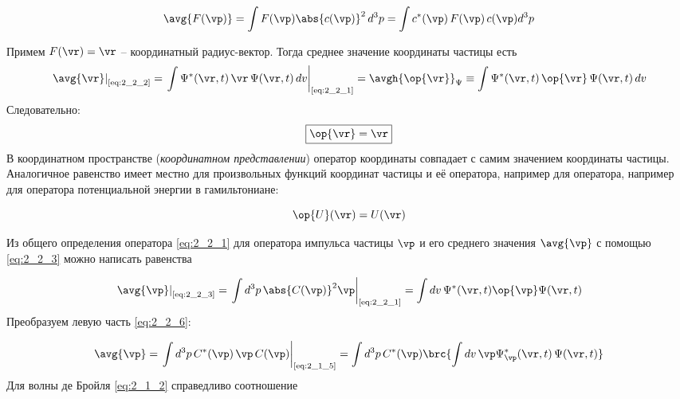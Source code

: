 \begin{equation}
\label{eq:2_2_3}
\avg{F(\vp)} = \int F(\vp) \abs{c(\vp)}^2 \, d^3 p = \int c^*(\vp) \, F(\vp) \, c(\vp) d^3 p 
\end{equation}

Примем $F(\vr) = \vr$ -- координатный радиус-вектор. Тогда среднее значение координаты частицы есть
$$
\left. \avg{\vr} \right|_{\text{\eqref{eq:2_2_2}}} = 
  \left. \int \Psi^*(\vr, t) \, \vr \, \Psi(\vr,t) \, dv \right|_{\text{\eqref{eq:2_2_1}}} =
  \avgh{\op{\vr}}_\Psi \equiv \int \Psi^*(\vr,t) \, \op{\vr} \, \Psi(\vr,t) \, dv
$$%
%
Следовательно:
\begin{equation}
\label{eq:2_2_4}
\boxed{\op{\vr} = \vr}
\end{equation}%
%
В координатном пространстве ({\em координатном представлении}) оператор координаты совпадает с самим значением координаты частицы. Аналогичное равенство имеет местно для произвольных функций координат частицы и её оператора, например для оператора, например для оператора потенциальной энергии в гамильтониане:

\begin{equation}
\label{eq:2_2_5}
\op{U}(\vr) = U(\vr)
\end{equation}

Из общего определения оператора \eqref{eq:2_2_1} для оператора импульса частицы $\vp$ и его среднего значения $\avg{\vp}$ с помощью \eqref{eq:2_2_3} можно написать равенства

\begin{equation}
\label{eq:2_2_6}
\left. \avg{\vp} \right|_{\text{\eqref{eq:2_2_3}}} = 
  \left. \int d^3 p \, \abs{C(\vp)}^2 \vp \right|_{\text{\eqref{eq:2_2_1}}} = 
  \int dv \, \Psi^*(\vr,t) \op{\vp} \Psi(\vr,t)
\end{equation}%
%
Преобразуем левую часть \eqref{eq:2_2_6}:

$$
\avg{\vp} = \left. \int d^3 p \, C^*(\vp) \, \vp \, C(\vp) \right|_{\text{\eqref{eq:2_1_5}}} =
  \int d^3 p \, C^*(\vp) \brc{ \int dv \, \vp \Psi_{\vp}^*(\vr,t) \, \Psi(\vr,t) }
$$%
%
Для волны де Бройля \eqref{eq:2_1_2} справедливо соотношение

